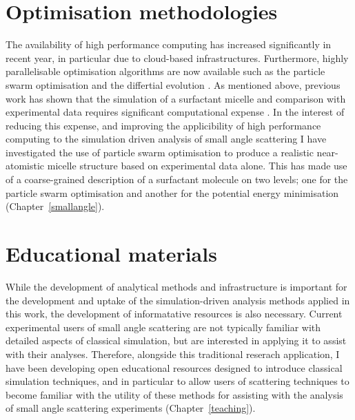 \section{Optimisation methodologies}

The availability of high performance computing has increased significantly in recent year, in particular due to cloud-based infrastructures.
Furthermore, highly parallelisable optimisation algorithms are now available such as the particle swarm optimisation \cite{kennedy_particle_1995,shi_modified_1998} and the differtial evolution \cite{storn_differential_1997}.
As mentioned above, previous work has shown that the simulation of a surfactant micelle and comparison with experimental data requires significant computational expense \cite{hargreaves_atomistic_2011,ivanovic_temperature-dependent_2018}.
In the interest of reducing this expense, and improving the applicibility of high performance computing to the simulation driven analysis of small angle scattering I have investigated the use of particle swarm optimisation to produce a realistic near-atomistic micelle structure based on experimental data alone.
This has made use of a coarse-grained description of a surfactant molecule on two levels; one for the particle swarm optimisation and another for the potential energy minimisation (Chapter~\ref{smallangle}).

\section{Educational materials}

While the development of analytical methods and infrastructure is important for the development and uptake of the simulation-driven analysis methods applied in this work, the development of informatative resources is also necessary.
Current experimental users of small angle scattering are not typically familiar with detailed aspects of classical simulation, but are interested in applying it to assist with their analyses.
Therefore, alongside this traditional reserach application, I have been developing open educational resources designed to introduce classical simulation techniques, and in particular to allow users of scattering techniques to become familiar with the utility of these methods for assisting with the analysis of small angle scattering experiments (Chapter~\ref{teaching}).
